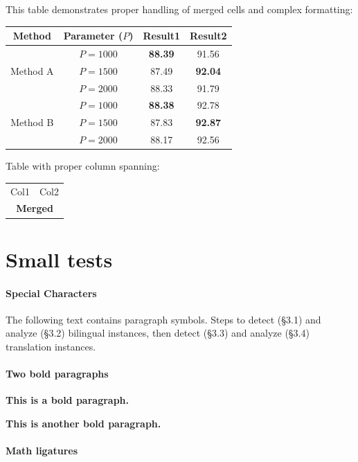 \documentclass{article}
\begin{document}
This table demonstrates proper handling of merged cells and complex formatting:

\begin{tabular}{cccc}
    \toprule
    Method & Parameter ($P$) & Result1 & Result2\\
    \midrule
     \multirow{3}{*}{Method A} 
     &${P=1000}$ & \textbf{88.39}  & 91.56  \\
     &${P=1500}$ & 87.49 & \textbf{92.04}\\
     &${P=2000}$ & 88.33 & 91.79\\
    \midrule
    \multirow{3}{*}{Method B} 
     &${P=1000}$ & \textbf{88.38}  & 92.78 \\
     &${P=1500}$ & 87.83 & \textbf{92.87} \\
     &${P=2000}$ & 88.17 & 92.56\\
    \bottomrule
\end{tabular}

Table with proper column spanning:

\begin{tabular}{cc}
    \toprule
    Col1 & Col2 \\
    \multicolumn{2}{c}{\textbf{Merged}} \\
    \bottomrule
\end{tabular}

\section{Small tests}

\paragraph{Special Characters}
The following text contains paragraph symbols.
Steps to detect (\S3.1) and analyze (\S3.2) bilingual instances, then detect (\S3.3) and analyze (\S3.4) translation instances. 

\paragraph{Two bold paragraphs}
\textbf{This is a bold paragraph.}

\textbf{This is another bold paragraph.}

\paragraph{Math ligatures}
\end{document}
